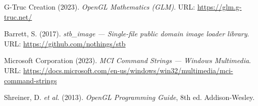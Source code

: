 \documentclass[12pt,a4paper]{article}
\begin{document}
\vspace{6pt}\noindent
G-Truc Creation (2023). \textit{OpenGL Mathematics (GLM)}.
URL: \url{https://glm.g-truc.net/}

\vspace{6pt}\noindent
Barrett, S. (2017). \textit{stb\_image — Single-file public domain image
loader library}.
URL: \url{https://github.com/nothings/stb}

\vspace{6pt}\noindent
Microsoft Corporation (2023). \textit{MCI Command Strings — Windows Multimedia}.
URL: \url{https://docs.microsoft.com/en-us/windows/win32/multimedia/mci-command-strings}

\vspace{6pt}\noindent
Shreiner, D. \textit{et al.} (2013). \textit{OpenGL Programming Guide}, 8th ed.
Addison-Wesley.
\end{document}
